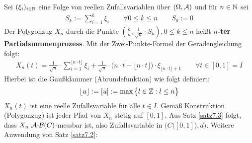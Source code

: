 \begin{beispiel}\label{beispiel7.4}
Sei $(\xi_i)_{i\in\mathbb{N}}$ eine Folge von reellen Zufallsvariablen über $(\Omega,\mathcal{A})$ und für $n\in\mathbb{N}$ sei
\begin{align*}
S_k:=\sum\limits_{i=1}^k\xi_i\qquad\forall0\leq k\leq n\qquad S_0:=0
\end{align*}
Der Polygonzug $X_n$ durch die Punkte $\left(\frac{k}{n},\frac{1}{\sqrt{n}}\cdot S_k\right),0\leq k\leq n$ heißt \textbf{$n$-ter Partialsummenprozess}.
Mit der Zwei-Punkte-Formel der Geradengleichung folgt:
\begin{align*}
X_n(t)=\frac{1}{\sqrt{n}}\cdot\sum\limits_{i=1}^{\lfloor n\cdot t\rfloor}\xi_i+\frac{1}{\sqrt{n}}\cdot\big(n\cdot t-\lfloor n\cdot t\rfloor\big)\cdot\xi_{\lfloor n\cdot t\rfloor+1}\qquad\forall t\in[0,1]=I
\end{align*}
Hierbei ist die Gaußklammer (Abrundefunktion) wie folgt definiert:
\begin{align*}
\lfloor u\rfloor:=[u]:=\max\big\lbrace l\in\mathbb{Z}:l\leq n\big\rbrace
\end{align*}
$X_n(t)$ ist eine reelle Zufallsvariable für alle $t\in I$. Gemäß Konstruktion (Polygonzug) ist jeder Pfad von $X_n$ stetig auf $[0,1]$. Aus Satz \ref{satz7.3} folgt, dass $X_n~\mathcal{A}\text{-}\mathcal{B}(C)$-messbar ist, also Zufallsvariable in $\Big(C\big([0,1]\big),d\Big)$. Weitere Anwendung von Satz \ref{satz7.2}:
\end{beispiel}


